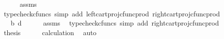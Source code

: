 \begin{isabellebody}
\ \ \ \ \isamarkupfalse%
\ assms\ \isamarkupfalse%
\ {\isacharparenleft}{\kern0pt}typecheck{\isacharunderscore}{\kern0pt}cfuncs{\isacharcomma}{\kern0pt}\ simp\ add{\isacharcolon}{\kern0pt}\ left{\isacharunderscore}{\kern0pt}cart{\isacharunderscore}{\kern0pt}proj{\isacharunderscore}{\kern0pt}cfunc{\isacharunderscore}{\kern0pt}prod\ right{\isacharunderscore}{\kern0pt}cart{\isacharunderscore}{\kern0pt}proj{\isacharunderscore}{\kern0pt}cfunc{\isacharunderscore}{\kern0pt}prod{\isacharparenright}{\kern0pt}\isanewline
\ \ \isamarkupfalse%
\ \isamarkupfalse%
\ {\isachardoublequoteopen}{\isachardot}{\kern0pt}{\isachardot}{\kern0pt}{\isachardot}{\kern0pt}\ {\isacharequal}{\kern0pt}\ {\isasymlangle}b{\isacharcomma}{\kern0pt}\ d{\isasymrangle}{\isachardoublequoteclose}\isanewline
\ \ \ \ \isamarkupfalse%
\ assms\ \isamarkupfalse%
\ {\isacharparenleft}{\kern0pt}typecheck{\isacharunderscore}{\kern0pt}cfuncs{\isacharcomma}{\kern0pt}\ simp\ add{\isacharcolon}{\kern0pt}\ right{\isacharunderscore}{\kern0pt}cart{\isacharunderscore}{\kern0pt}proj{\isacharunderscore}{\kern0pt}cfunc{\isacharunderscore}{\kern0pt}prod{\isacharparenright}{\kern0pt}\isanewline
\ \ \isamarkupfalse%
\ \isamarkupfalse%
\ {\isacharquery}{\kern0pt}thesis\isanewline
\ \ \ \ \isamarkupfalse%
\ calculation\ \isamarkupfalse%
\ auto\isanewline
{}\isamarkupfalse%
%
\endisatagproof
{\isafoldproof}%
%
\isadelimproof
\isanewline
%
\endisadelimproof
%
\isadelimtheory
\isanewline
%
\endisadelimtheory
%
\isatagtheory
{}\isamarkupfalse%
%
\endisatagtheory
{\isafoldtheory}%
%
\isadelimtheory
%
\endisadelimtheory
%
\end{isabellebody}%
\endinput
